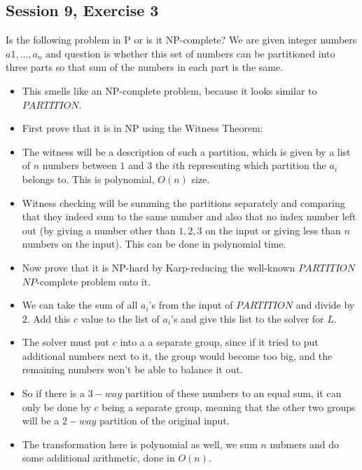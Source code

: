 \subsection {Session 9, Exercise 3}


 Is the following problem in P or is it NP-complete? We are given integer numbers $a1, \dots{}, a_n$ and question
is whether this set of numbers can be partitioned into three parts so that sum of the numbers in each part
is the same.


\begin{itemize}
    \item This smells like an NP-complete problem, because it looks similar to $PARTITION$.
    \item First prove that it is in NP using the Witness Theorem:
    \item The witness will be a description of such a partition, which is given by a list of $n$ numbers between $1$ and $3$ the $i$th representing which partition the $a_i$ belongs to. This is polynomial, $O(n)$ size.
    \item Witness checking will be summing the partitions separately and comparing that they indeed sum to the same number and also that no index number left out (by giving a number other than $1,2,3$ on the input or giving less than $n$ numbers on the input). This can be done in polynomial time.
    \item Now prove that it is NP-hard by Karp-reducing the well-known $PARTITION$ $NP$-complete problem onto it.
    \item We can take the sum of all $a_i$'s from the input of $PARTITION$ and divide by $2$. Add this $c$ value to the list of $a_i$'s and give this list to the solver for $L$.
    \item The solver must put $c$ into a a separate group, since if it tried to put additional numbers next to it, the group would become too big, and the remaining numbers won't be able to balance it out.
    \item So if there is a $3-way$ partition of these numbers to an equal sum, it can only be done by $c$ being a separate group, meaning that the other two groups will be a $2-way$ partition of the original input.
    \item The transformation here is polynomial as well, we sum $n$ nubmers and do some additional arithmetic, done in $O(n)$.
\end{itemize}
